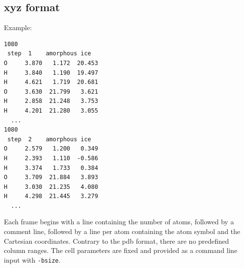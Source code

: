\documentclass[a4paper,11pt]{article}
\begin{document}
\subsection{xyz format}

Example:
\begingroup\fontsize{8pt}{12pt}\selectfont
\begin{verbatim}
1080
 step  1    amorphous ice
O     3.870   1.172  20.453 
H     3.840   1.190  19.497 
H     4.621   1.719  20.681 
O     3.630  21.799   3.621 
H     2.858  21.248   3.753 
H     4.201  21.280   3.055 
  ...
1080
 step  2    amorphous ice
O     2.579   1.200   0.349  
H     2.393   1.110  -0.586  
H     3.374   1.733   0.384  
O     3.709  21.884   3.893  
H     3.030  21.235   4.080  
H     4.298  21.445   3.279  
  ...
\end{verbatim}
\endgroup
Each frame begins with a line containing the number of atoms, followed by a comment line, followed by a line per atom
containing the atom symbol and the Cartesian coordinates. Contrary to the pdb format, there are no predefined column ranges.
The cell parameters are fixed and provided as a command line input with \texttt{-bsize}.

\end{document}
